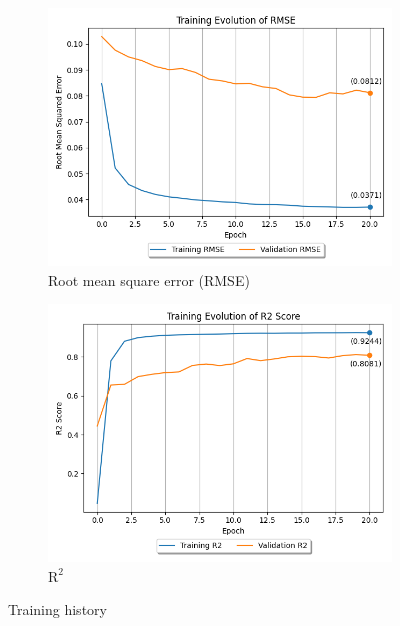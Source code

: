 \documentclass[12pt]{article}
\begin{document}
\begin{figure}[H]
    \begin{subfigure}[b]{0.49\textwidth}
        \centering
        \includegraphics[width=\textwidth]{Problem 3/out/training_history_rmse.png}
        \caption{Root mean square error (RMSE)}
        \label{fig:p3-rmse-training-history}
    \end{subfigure}
    \begin{subfigure}[b]{0.49\textwidth}
        \centering
        \includegraphics[width=\textwidth]{Problem 3/out/training_history_r2.png}
        \caption{$\text{R}^2$}
        \label{fig:p3-r2-training-history}
    \end{subfigure}
    \caption{Training history}
    \label{fig:p3-training-history}
\end{figure}
\end{document}
